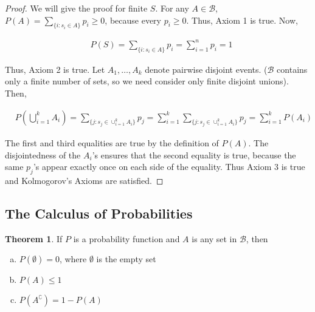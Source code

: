 \documentclass[11pt,a4paper]{report}
\theoremstyle{definition}
\theoremstyle{theorem}
\newtheorem{thm}{Theorem}[section]
\begin{document}
\begin{proof}
We will give the proof for finite $S$.  For any $A \in \mathcal{B}$,
$P(A) = \sum_{\{i:s_i \in A\}} p_i \ge 0$, because every $p_i \ge 0$.
Thus, Axiom 1 is true.  Now,

\begin{align*}
  & P(S) = \sum_{\{i:s_i \in A\}} p_i = \sum_{i=1}^n p_i = 1
\end{align*}

Thus, Axiom 2 is true.  Let $A_1, \dots, A_k$ denote pairwise disjoint
events.  ($\mathcal{B}$ contains only a finite number of sets, so we
need consider only finite disjoint unions).  Then,

\begin{align*}
  & P \left( \bigcup_{i=1}^k A_i \right) = \sum_{\{j:s_j \in
    \cup_{i=1}^k A_i \}} p_j = \sum_{i=1}^k \sum_{\{j:s_j \in
    \cup_{i=1}^k A_i \}} p_j = \sum_{i=1}^k P(A_i)
\end{align*}

The first and third equalities are true by the definition of $P(A)$.
The disjointedness of the $A_i$'s ensures that the second equality is
true, because the same $p_j$'s appear exactly once on each side of the
equality.  Thus Axiom 3 is true and Kolmogorov's Axioms are satisfied.

\end{proof}

\subsection{The Calculus of Probabilities}

\begin{thm}
If $P$ is a probability function and $A$ is any set in $\mathcal{B}$,
then

\begin{enumerate}[(a)]

\item $P(\emptyset) = 0$, where $\emptyset$ is the empty set

\item $P(A) \le 1$

\item $P(A^{\complement}) = 1 - P(A)$

\end{enumerate}

\end{thm}
\end{document}
